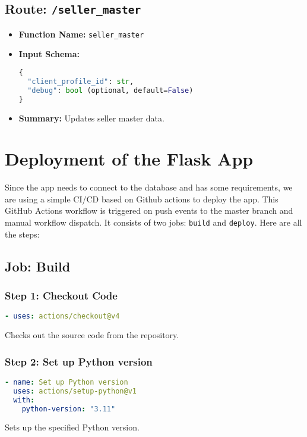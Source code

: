 \subsection{Route: \texttt{/seller\_master}}
\begin{itemize}
  \item \textbf{Function Name:} \texttt{seller\_master}
  \item \textbf{Input Schema:}
        \begin{lstlisting}[language=Python]
{
  "client_profile_id": str,
  "debug": bool (optional, default=False)
}
  \end{lstlisting}
  \item \textbf{Summary:} Updates seller master data.
\end{itemize}

\section{Deployment of the Flask App}

Since the app needs to connect to the database and has some requirements, we are using a simple CI/CD based on Github actions to deploy the app. This GitHub Actions workflow is triggered on push events to the master branch and manual workflow dispatch. It consists of two jobs: \texttt{build} and \texttt{deploy}. Here are all the steps:

\subsection{Job: Build}

\subsubsection{Step 1: Checkout Code}
\begin{lstlisting}[language=yaml]
- uses: actions/checkout@v4
\end{lstlisting}
Checks out the source code from the repository.

\subsubsection{Step 2: Set up Python version}
\begin{lstlisting}[language=yaml]
- name: Set up Python version
  uses: actions/setup-python@v1
  with:
    python-version: "3.11"
\end{lstlisting}
Sets up the specified Python version.


